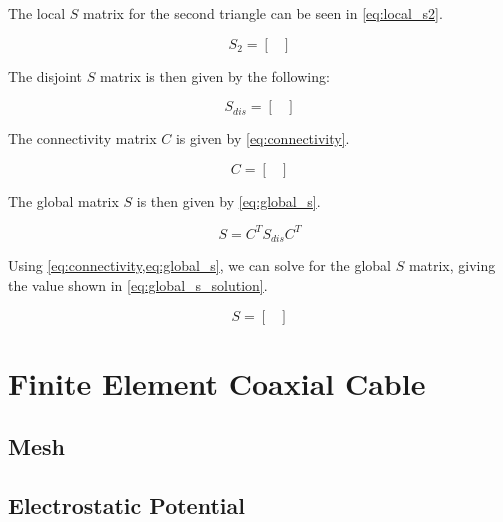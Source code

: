 \documentclass[a4paper,titlepage]{article}
\begin{document}
	The local $S$ matrix for the second triangle can be seen in \cref{eq:local_s2}.
	
	\begin{equation} \label{eq:local_s2}
		S_2 =
			\begin{bmatrix}
				
			\end{bmatrix}
	\end{equation}
	
	The disjoint $S$ matrix is then given by the following:

	\begin{equation*}
		S_{dis} =
			\begin{bmatrix}
				
			\end{bmatrix}
	\end{equation*}
	
	The connectivity matrix $C$ is given by \cref{eq:connectivity}.

	\begin{equation} \label{eq:connectivity}
		C =
			\begin{bmatrix}
				
			\end{bmatrix}
	\end{equation}
	
	The global matrix $S$ is then given by \cref{eq:global_s}.
	
	\begin{equation} \label{eq:global_s}
		S = C^T S_{dis} C^T
	\end{equation}
	
	Using \cref{eq:connectivity,eq:global_s}, we can solve for the global $S$ matrix, giving the value shown in \cref{eq:global_s_solution}.
	
	\begin{equation} \label{eq:global_s_solution}
		S =
			\begin{bmatrix}
				
			\end{bmatrix}
	\end{equation}
	
	\section{Finite Element Coaxial Cable}
	
	\subsection{Mesh}
	
	\subsection{Electrostatic Potential}
	
\end{document}
